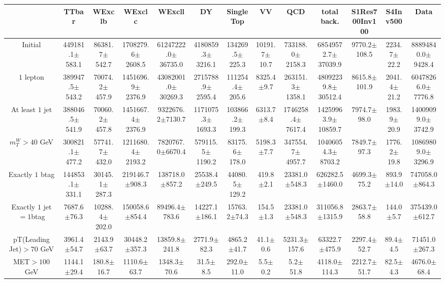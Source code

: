 \documentclass[10pt]{article}
\begin{document}
\begin{table}[p]
\begin{tabular}{|c|c|c|c|c|c|c|c|c|c|c|c|c|}
\hline
\hline
      & TTbar  & WExclb  & WExclc  & WExcll  & DY  & SingleTop  & VV  & QCD  & total back. & S1Res700Inv100  & S4Inv500  & Data  \\ 
\hline 
Initial & 449181.1$\pm$583.1 & 86381.7$\pm$542.7 & 1708279.6$\pm$2608.5 & 61247222.0$\pm$36735.0 & 4180859.3$\pm$3216.1 & 134269.5$\pm$225.3 & 10191.7$\pm$10.7 & 733188.0$\pm$2158.3 & 68549572.7$\pm$37039.9 & 9770.2$\pm$108.5 & 2234.7$\pm$22.2 & 88894840.0$\pm$9428.4\\ 
\hline 
$1$ lepton & 389947.5$\pm$543.2 & 70074.2$\pm$457.9 & 1451696.9$\pm$2376.9 & 43082001.0$\pm$30269.3 & 2715788.9$\pm$2595.4 & 111254.4$\pm$205.6 & 8325.4$\pm$9.7 & 263151.3$\pm$1358.1 & 48092239.8$\pm$30512.4 & 8615.8$\pm$101.9 & 2041.4$\pm$21.2 & 60478266.0$\pm$7776.8\\ 
\hline 
At least $1$ jet & 388046.5$\pm$541.9 & 70060.2$\pm$457.8 & 1451667.4$\pm$2376.9 & 9322676.2$\pm$7130.7 & 1171075.3$\pm$1693.3 & 103866.2$\pm$199.3 & 6313.7$\pm$8.4 & 1746258.4$\pm$7617.4 & 14259963.9$\pm$10859.7 & 7974.7$\pm$98.0 & 1983.9$\pm$20.9 & 14009099.0$\pm$3742.9\\ 
\hline 
$m_{T}^{W} > 40$ GeV & 300821.1$\pm$477.2 & 57741.7$\pm$432.0 & 1211680.4$\pm$2193.2 & 7820767.0$\pm$6670.4 & 579115.5$\pm$1190.2 & 83175.6$\pm$178.0 & 5198.3$\pm$7.7 & 347554.7$\pm$4957.7 & 10406054.3$\pm$8703.2 & 7849.7$\pm$97.3 & 1776.2$\pm$19.8 & 10869809.0$\pm$3296.9\\ 
\hline 
Exactly $1$ btag  & 144853.1$\pm$331.1 & 30145.1$\pm$287.3 & 219146.7$\pm$908.3 & 138718.0$\pm$857.2 & 25538.4$\pm$249.5 & 44080.5$\pm$129.2 & 419.8$\pm$2.1 & 23381.0$\pm$548.3 & 626282.5$\pm$1460.0 & 4699.3$\pm$75.2 & 893.9$\pm$14.0 & 747058.0$\pm$864.3\\ 
\hline 
Exactly $1$ jet $= 1$btag & 7687.6$\pm$76.3 & 10288.4$\pm$202.0 & 150058.6$\pm$854.4 & 89496.4$\pm$783.6 & 14227.1$\pm$186.1 & 15763.2$\pm$74.3 & 154.5$\pm$1.3 & 23381.0$\pm$548.3 & 311056.8$\pm$1315.9 & 2863.7$\pm$58.8 & 144.0$\pm$5.7 & 375439.0$\pm$612.7\\ 
\hline 
pT(Leading Jet)$ > 70$ GeV & 3961.4$\pm$54.7 & 2143.9$\pm$63.7 & 30448.2$\pm$357.3 & 13859.8$\pm$241.8 & 2771.9$\pm$82.3 & 4865.2$\pm$41.7 & 41.1$\pm$0.6 & 5231.3$\pm$157.6 & 63322.7$\pm$475.9 & 2297.4$\pm$52.7 & 89.4$\pm$4.5 & 71451.0$\pm$267.3\\ 
\hline 
MET$ > 100$ GeV & 1144.1$\pm$29.4 & 180.8$\pm$16.7 & 1110.6$\pm$63.7 & 1348.3$\pm$70.6 & 31.5$\pm$8.5 & 292.0$\pm$11.0 & 5.5$\pm$0.2 & 5.2$\pm$51.8 & 4118.0$\pm$114.3 & 2212.7$\pm$51.7 & 82.5$\pm$4.3 & 4676.0$\pm$68.4\\ 

\end{tabular}
\end{table}
\end{document}
